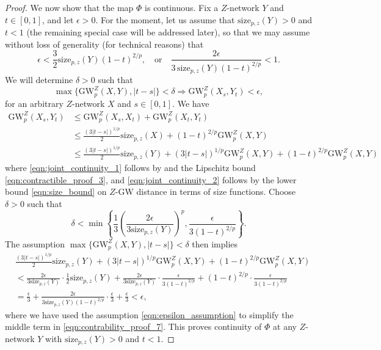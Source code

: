 \documentclass[twoside,11pt]{article}
\theoremstyle{definition}
\newcommand{\dgwz}{\mathrm{GW}_p^Z}
\begin{document}
\begin{proof}
 \smallskip
 We now show that the map $\Phi$ is continuous. Fix a $Z$-network $Y$ and $t \in [0,1]$, and let $\epsilon > 0$. For the moment, let us assume that $\mathrm{size}_{p,z}(Y) > 0$ and $t < 1$ (the remaining special case will be addressed later), so that we may assume without loss of generality (for technical reasons) that
 \begin{equation}\label{eqn:epsilon_assumption}
 \epsilon < \frac{3}{2} \mathrm{size}_{p,z}(Y) (1-t)^{2/p}, \quad \mbox{or} \quad \frac{2\epsilon}{3\,\mathrm{size}_{p,z}(Y)(1-t)^{2/p}} < 1.
 \end{equation}
 We will determine $\delta > 0$ such that
 \[
 \max\{\dgwz(X,Y),|t-s|\} < \delta \Rightarrow \dgwz(X_s,Y_t) < \epsilon,
 \]
 for an arbitrary $Z$-network $X$ and $s \in [0,1]$. We have
 \begin{align}
     \dgwz(X_s,Y_t) &\leq \dgwz(X_s,X_t) + \dgwz(X_t,Y_t) \\
     &\leq \frac{(3|t-s|)^{1/p}}{2} \mathrm{size}_{p,z}(X) + (1-t)^{2/p} \dgwz(X,Y) \label{eqn:joint_continuity_1} \\
     &\leq  \frac{(3|t-s|)^{1/p}}{2} \mathrm{size}_{p,z}(Y) + (3|t-s|)^{1/p} \dgwz(X,Y) + (1-t)^{2/p} \dgwz(X,Y) \label{eqn:joint_continuity_2}
 \end{align}
 where \eqref{eqn:joint_continuity_1} follows by  and the Lipschitz bound \eqref{eqn:contractible_proof_3}, and \eqref{eqn:joint_continuity_2} follows by the lower bound \eqref{eqn:size_bound} on $Z$-GW distance in terms of size functions. Choose $\delta > 0$ such that
 \[
 \delta < \min\left\{\frac{1}{3}\left(\frac{2\epsilon}{3\mathrm{size}_{p,z}(Y)}\right)^p, \frac{\epsilon}{3(1-t)^{2/p}}   \right\}.
 \]
 The assumption
 $
 \max\{\dgwz(X,Y),|t-s|\} < \delta
 $
 then implies 
 \begin{align}
     &\frac{(3|t-s|)^{1/p}}{2} \mathrm{size}_{p,z}(Y) + (3|t-s|)^{1/p} \dgwz(X,Y) + (1-t)^{2/p} \dgwz(X,Y) \\
     &< \frac{2\epsilon}{3\mathrm{size}_{p,z}(Y)} \cdot \frac{1}{2} \mathrm{size}_{p,z}(Y) + \frac{2\epsilon}{3\mathrm{size}_{p,z}(Y)} \cdot \frac{\epsilon}{3(1-t)^{2/p}} + (1-t)^{2/p} \cdot \frac{\epsilon}{3(1-t)^{2/p}} \\
     &= \frac{\epsilon}{3} + \frac{2\epsilon}{3\mathrm{size}_{p,z}(Y)(1-t)^{2/p}} \cdot \frac{\epsilon}{3} + \frac{\epsilon}{3} < \epsilon, \label{eqn:contrability_proof_7}
 \end{align}
 where we have used the assumption \eqref{eqn:epsilon_assumption} to simplify the middle term in \eqref{eqn:contrability_proof_7}. This proves  continuity of $\Phi$ at any $Z$-network $Y$ with $\mathrm{size}_{p,z}(Y) > 0$ and $t < 1$. 
 

\end{proof}
\end{document}
